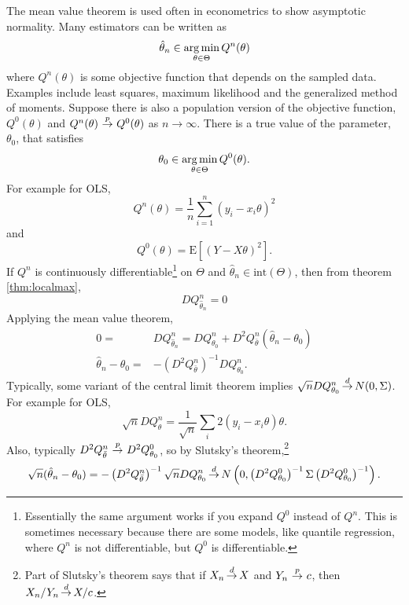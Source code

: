 \begin{example}
  The mean value theorem is used often in econometrics to show
  asymptotic normality. Many estimators can be written as
  \begin{align*}
    \hat{\theta}_n \in \argmin_{\theta \in \Theta} Q^n(\theta) 
  \end{align*}
  where $Q^n(\theta)$ is some objective function that depends on the
  sampled data. Examples include least squares, maximum likelihood and
  the generalized method of moments.  Suppose there is also a
  population version of the objective function, $Q^0(\theta)$ and
  $Q^n(\theta) \inprob Q^0(\theta)$ as $n \to \infty$. There is a true
  value of the parameter, $\theta_0$, that satisfies
  \[ \theta_0 \in \argmin_{\theta \in \Theta} Q^0(\theta). \] 
  For example for OLS, 
  \[ Q^n(\theta) = \frac{1}{n} \sum_{i=1}^n (y_i - x_i \theta)^2 \]
  and
  \[ Q^0(\theta) = \mathrm{E}\left[ (Y - X \theta)^2 \right]. \] If
  $Q^n$ is continuously differentiable\footnote{Essentially the same
    argument works if you expand $Q^0$ instead of $Q^n$. This is
    sometimes necessary because there are some models, like quantile
    regression, where $Q^n$ is not differentiable, but $Q^0$ is
    differentiable.} on $\Theta$ and $\hat{\theta}_n \in
  \mathrm{int}(\Theta)$, then from theorem \ref{thm:localmax},
  \[ DQ^n_{\hat{\theta}_n} = 0 \]
  Applying the mean value theorem, 
  \begin{align*}
    0 = & DQ^n_{\hat{\theta}_n} = DQ^n_{\theta_0} + D^2
    Q^n_{\bar{\theta}}(\hat{\theta}_n - \theta_0 ) \\
    \hat{\theta}_n - \theta_0 = & -\left(D^2 Q^n_{\bar{\theta}}
    \right)^{-1} DQ^n_{\theta_0}.
  \end{align*}
  Typically, some variant of the central limit theorem implies
  $\sqrt{n} DQ^n_{\theta_0} \indist N(0,\Sigma)$. For example for
  OLS,
  \[\sqrt{n} DQ^n_\theta = \frac{1}{\sqrt{n}} \sum_i 2 (y_i - x_i
  \theta ) \theta. \] Also, typically $D^2 Q^n_{\bar{\theta}} \inprob
  D^2 Q^0_{\theta_0}$, so by Slutsky's theorem,\footnote{Part of
    Slutsky's theorem says that if $X_n \indist X$ and $Y_n \inprob
    c$, then $X_n/Y_n \indist X/c$.}
  \[ \sqrt{n} (\hat{\theta}_n - \theta_0 ) = -\left(D^2
    Q^n_{\bar{\theta}} \right)^{-1} \sqrt{n} DQ^n_{\theta_0} \indist
  N\left( 0, \left(D^2 Q^0_{\theta_0} \right)^{-1} \Sigma \left(D^2
      Q^0_{\theta_0} \right)^{-1} \right). \]
\end{example}

